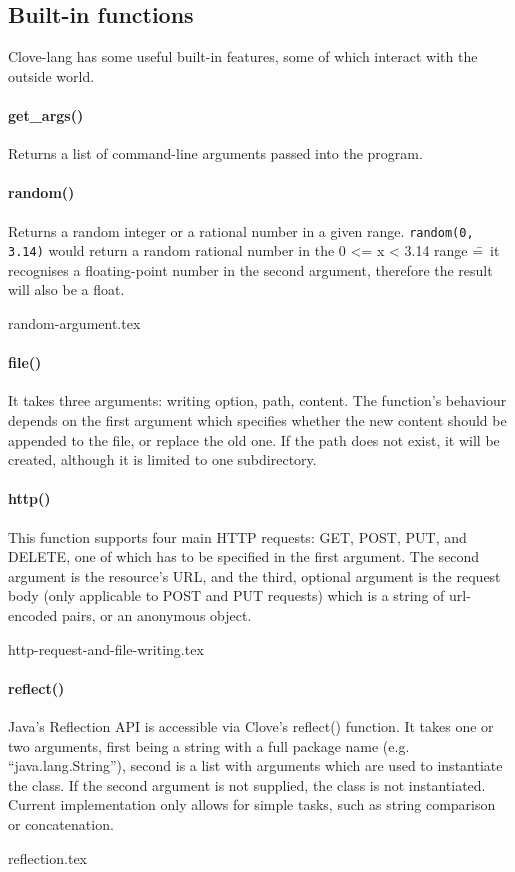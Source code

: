 \documentclass[12pt,a4paper]{article}
\begin{document}
\vspace{-1.75em}
\subsection*{Built-in functions}
Clove-lang has some useful built-in features, some of which interact with the outside world.

\paragraph*{get\_args()}
Returns a list of command-line arguments passed into the program.

\vspace{-0.75em}
\paragraph*{random()}
Returns a random integer or a rational number in a given range. \texttt{random(0, 3.14)} would return a random rational number in the 0 <= x < 3.14 range \==~it recognises a floating-point number in the second argument, therefore the result will also be a float.

{random-argument.tex}


\vspace{-2.75em}
\paragraph*{file()}
It takes three arguments: writing option, path, content. The function's behaviour depends on the first argument which specifies whether the new content should be appended to the file, or replace the old one. If the path does not exist, it will be created, although it is limited to one subdirectory.

\vspace{-0.75em}
\paragraph*{http()}
This function supports four main HTTP requests: GET, POST, PUT, and DELETE, one of which has to be specified in the first argument. The second argument is the resource's URL, and the third, optional argument is the request body (only applicable to POST and PUT requests) which is a string of url-encoded pairs, or an anonymous object.

{http-request-and-file-writing.tex}


\vspace{-2.75em}
\paragraph*{reflect()}
Java's Reflection API is accessible via Clove's reflect() function. It takes one or two arguments, first being a string with a full package name (e.g. ``java.lang.String''), second is a list with arguments which are used to instantiate the class. If the second argument is not supplied, the class is not instantiated. Current implementation only allows for simple tasks, such as string comparison or concatenation.

{reflection.tex}
\end{document}
